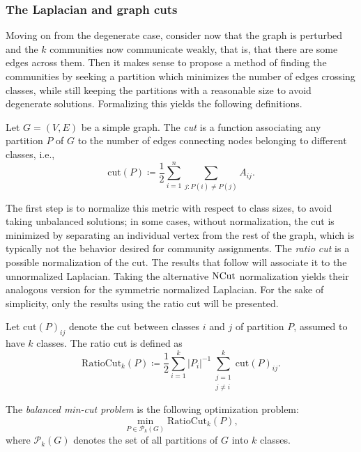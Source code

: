 \documentclass[../../main.tex]{subfiles} %
\begin{document}
\subsubsection{The Laplacian and graph cuts}  %
Moving on from the degenerate case, consider now that the graph is perturbed 
and the \(k\) communities now communicate weakly, that is, that there are 
some edges across them. Then it makes sense to propose a method of finding 
the communities by seeking a partition which minimizes the number of edges 
crossing classes, while still keeping the partitions with a reasonable size to 
avoid degenerate solutions. Formalizing this yields the following definitions.
\begin{definition}  %
	Let \(G = (V, E)\) be a simple graph. The \textit{cut} is a function associating 
	any partition \(P\) of \(G\) to the number of edges connecting nodes 
	belonging to different classes, i.e.,
	\begin{equation}
		\text{cut}(P) \coloneqq \frac{1}{2} \sum_{i=1}^n  \sum_{j: P(i) \neq P(j)} 
		A_{ij}.
	\end{equation}
\end{definition}

The first step is to normalize this metric with respect to class sizes, to avoid 
taking unbalanced solutions; in some cases, without normalization, the 
cut 
is minimized by separating an individual vertex from the rest of the 
graph, 
which is typically not the behavior desired for community assignments. 
The 
\textit{ratio cut} is a possible normalization of the cut. The results that 
follow 
will associate it to the unnormalized Laplacian. Taking the alternative 
\(\textup{NCut}\) normalization yields their analogous version for the 
symmetric normalized Laplacian. For the sake of simplicity, only the 
results 
using the ratio cut will be presented.
\begin{definition}  %
	Let \(\text{cut}(P)_{ij}\) denote the cut between classes \(i\) and \(j\) of 
	partition \(P\), assumed to have \(k\) classes. The ratio cut is defined as
	\begin{equation}
		\text{RatioCut}_k (P) \coloneqq \frac{1}{2} \sum_{i=1}^k \vert P_i 
		\vert^{-1} \sum_{\substack{j=1 \\ j \neq i}}^k \text{cut}(P)_{ij}.
	\end{equation}
\end{definition}

\begin{definition}  %
	The \textit{balanced min-cut problem} is the following optimization problem:
	\begin{equation} \label{eq:balanced-min-cut}
		\min_{P \in \mathcal P_k(G)} \text{RatioCut}_k(P),
	\end{equation} 
	where \(\mathcal P_k(G)\) denotes the set of all partitions of \(G\) into \(k\) 
	classes.
\end{definition}
\end{document}
